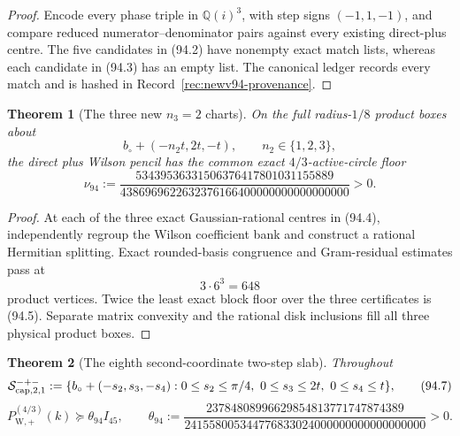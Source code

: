 \documentclass[11pt,oneside]{article}
\newtheorem{theorem}{Theorem}[section]
\theoremstyle{definition}
\theoremstyle{remark}
\begin{document}
\begin{proof}
Encode every phase triple in \(\mathbb Q(i)^3\), with step signs
\((-1,1,-1)\), and compare reduced numerator--denominator pairs
against every existing direct-plus centre.  The five candidates in
(94.2) have nonempty exact match lists, whereas each candidate in
(94.3) has an empty list.  The canonical ledger records every match
and is hashed in Record~\ref{rec:newv94-provenance}.
\end{proof}

\begin{theorem}[The three new \(n_3=2\) charts]
\label{thm:newv94-three-charts}
On the full radius-\(1/8\) product boxes about
\[
 b_\circ+(-n_2t,2t,-t),\qquad n_2\in\{1,2,3\},       \tag{94.4}
\]
the direct plus Wilson pencil has the common exact
\(4/3\)-active-circle floor
\[
\nu_{94}:=
\frac{53439536331506376417801031155889}
     {4386969622632376166400000000000000000}>0.       \tag{94.5}
\]
\end{theorem}

\begin{proof}
At each of the three exact Gaussian-rational centres in (94.4),
independently regroup the Wilson coefficient bank and construct a
rational Hermitian splitting.  Exact rounded-basis congruence and
Gram-residual estimates pass at
\[
 3\cdot6^3=648                                      \tag{94.6}
\]
product vertices.  Twice the least exact block floor over the three
certificates is (94.5).  Separate matrix convexity and the rational
disk inclusions fill all three physical product boxes.
\end{proof}

\begin{theorem}[The eighth second-coordinate two-step slab]
\label{thm:newv94-two-step-slab}
Throughout
\[
 {\cal S}^{-+-}_{\mathrm{cap},2,1}:=
 \{b_\circ+(-s_2,s_3,-s_4):
 0\leq s_2\leq\pi/4,\ 0\leq s_3\leq2t,\
 0\leq s_4\leq t\},                                 \tag{94.7}
\]
\[
 P_{\mathrm W,+}^{(4/3)}(k)
 \succeq\theta_{94}I_{45},\qquad
 \theta_{94}:=
 \frac{23784808996629854813771747874389}
 {241558005344776833024000000000000000000}>0.         \tag{94.8}
\]
\end{theorem}
\end{document}

